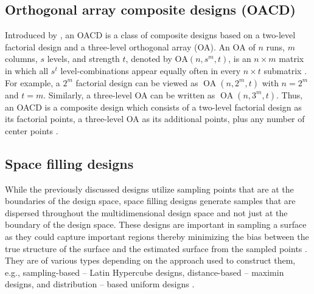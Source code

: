 \documentclass [PhD] {package/uclathes}
\begin{document}
\subsection*{Orthogonal array composite designs (OACD)}
Introduced by \textcite{xu2014combining}, an OACD is a class of composite designs based on a two-level factorial design and a three-level {orthogonal array (OA)}. An $\mathrm{OA}$ of $n$ runs, $m$ columns, $s$ levels, and strength $t$, denoted by $\mathrm{OA}\left(n, s^m, t\right)$, is an $n \times m$ matrix in which all $s^t$ level-combinations appear equally often in every $n \times t$ submatrix \parencite{wu2011experiments}. For example, a $2^m$ factorial design can be viewed as $\operatorname{OA}\left(n, 2^m, t\right)$ with $n=2^m$ and $t=m$. Similarly, a three-level OA can be written as $\operatorname{OA}\left(n, 3^m, t\right)$. Thus, an OACD is a composite design which consists of a two-level factorial design as its factorial points, a three-level OA as its additional points, plus any number of center points \parencite{luna2022orthogonal}.

\subsection*{Space filling designs}
While the previously discussed designs utilize sampling points that are at the boundaries of the design space, space filling designs generate samples that are dispersed throughout the multidimensional design space and not just at the boundary of the design space. These designs are important in sampling a surface as they could capture important regions thereby minimizing the bias between the true structure of the surface and the estimated surface from the sampled points \parencite{gardner2006small, giunta2003overview}. They are of various types depending on the approach used to construct them, e.g., sampling-based -- Latin Hypercube designs, distance-based -- maximin designs, and distribution -- based uniform designs \parencite{burton2022design}.
\end{document}
